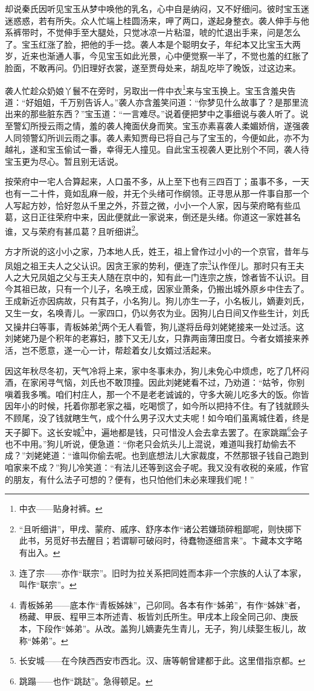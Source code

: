 \par 却说秦氏因听见宝玉从梦中唤他的乳名，心中自是纳闷，又不好细问。彼时宝玉迷迷惑惑，若有所失。众人忙端上桂圆汤来，呷了两口，遂起身整衣。袭人伸手与他系裤带时，不觉伸手至大腿处，只觉冰凉一片粘湿，唬的忙退出手来，问是怎么了。宝玉红涨了脸，把他的手一捻。袭人本是个聪明女子，年纪本又比宝玉大两岁，近来也渐通人事，今见宝玉如此光景，心中便觉察一半了，不觉也羞的红胀了脸面，不敢再问。仍旧理好衣裳，遂至贾母处来，胡乱吃毕了晚饭，过这边来。
\par 袭人忙趁众奶娘丫鬟不在旁时，另取出一件中衣\footnote{中衣——贴身衬裤。}来与宝玉换上。宝玉含羞央告道：“好姐姐，千万别告诉人。”袭人亦含羞笑问道：“你梦见什么故事了？是那里流出来的那些脏东西？”宝玉道：“一言难尽。”说着便把梦中之事细说与袭人听了。说至警幻所授云雨之情，羞的袭人掩面伏身而笑。宝玉亦素喜袭人柔媚娇俏，遂强袭人同领警幻所训云雨之事。袭人素知贾母已将自己与了宝玉的，今便如此，亦不为越礼，遂和宝玉偷试一番，幸得无人撞见。自此宝玉视袭人更比别个不同，袭人待宝玉更为尽心。暂且别无话说。
\par 按荣府中一宅人合算起来，人口虽不多，从上至下也有三四百丁；虽事不多，一天也有一二十件，竟如乱麻一般，并无个头绪可作纲领。正寻思从那一件事自那一个人写起方妙，恰好忽从千里之外，芥荳之微，小小一个人家，因与荣府略有些瓜葛，这日正往荣府中来，因此便就此一家说来，倒还是头绪。你道这一家姓甚名谁，又与荣府有甚瓜葛？且听细讲\footnote{ “且听细讲”，甲戌、蒙府、戚序、舒序本作“诸公若嫌琐碎粗鄙呢，则快掷下此书，另觅好书去醒目；若谓聊可破闷时，待蠢物逐细言来”。卞藏本文字略有出入。}。
\par 方才所说的这小小之家，乃本地人氏，姓王，祖上曾作过小小的一个京官，昔年与凤姐之祖王夫人之父认识。因贪王家的势利，便连了宗\footnote{连了宗——亦作“联宗”。旧时为拉关系把同姓而本非一个宗族的人认了本家，叫作“联宗”。}认作侄儿。那时只有王夫人之大兄凤姐之父与王夫人随在京中的，知有此一门连宗之族，馀者皆不认识。目今其祖已故，只有一个儿子，名唤王成，因家业萧条，仍搬出城外原乡中住去了。王成新近亦因病故，只有其子，小名狗儿。狗儿亦生一子，小名板儿，嫡妻刘氏，又生一女，名唤青儿。一家四口，仍以务农为业。因狗儿白日间又作些生计，刘氏又操井臼等事，青板姊弟\footnote{青板姊弟——底本作“青板姊妹”，己卯同。各本有作“姊弟”，有作“姊妹”者，杨藏、甲辰、程甲三本所述青、板皆刘氏所生。甲戌本上段全同己卯、庚辰本，下段作“姊弟”。从改。盖狗儿嫡妻先生青儿，无子，狗儿续娶生板儿，故称“姊弟”。}两个无人看管，狗儿遂将岳母刘姥姥接来一处过活。这刘姥姥乃是个积年的老寡妇，膝下又无儿女，只靠两亩薄田度日。今者女婿接来养活，岂不愿意，遂一心一计，帮趁着女儿女婿过活起来。
\par 因这年秋尽冬初，天气冷将上来，家中冬事未办，狗儿未免心中烦虑，吃了几杯闷酒，在家闲寻气恼，刘氏也不敢顶撞。因此刘姥姥看不过，乃劝道：“姑爷，你别嗔着我多嘴。咱们村庄人，那一个不是老老诚诚的，守多大碗儿吃多大的饭。你皆因年小的时候，托着你那老家之福，吃喝惯了，如今所以把持不住。有了钱就顾头不顾尾，没了钱就瞎生气，成个什么男子汉大丈夫呢！如今咱们虽离城住着，终是天子脚下。这长安城\footnote{长安城——在今陕西西安市西北。汉、唐等朝曾建都于此。这里借指京都。}中，遍地都是钱，只可惜没人会去拿去罢了。在家跳蹋\footnote{跳蹋——也作“跳跶”。急得顿足。}会子也不中用。”狗儿听说，便急道：“你老只会炕头儿上混说，难道叫我打劫偷去不成？”刘姥姥道：“谁叫你偷去呢。也到底想法儿大家裁度，不然那银子钱自己跑到咱家来不成？”狗儿冷笑道：“有法儿还等到这会子呢。我又没有收税的亲戚，作官的朋友，有什么法子可想的？便有，也只怕他们未必来理我们呢！”
